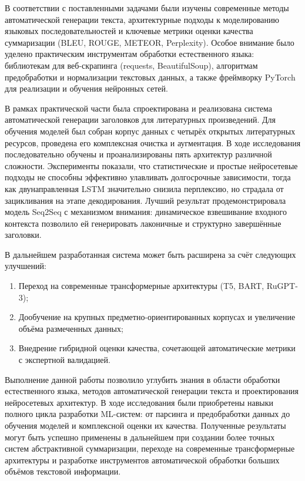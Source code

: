 \documentclass[coursework]{SCWorks}
\begin{document}
    \conclusion

    В соответствии с поставленными задачами были изучены современные методы автоматической генерации текста,
    архитектурные подходы к моделированию языковых последовательностей и ключевые метрики оценки качества суммаризации
    (BLEU, ROUGE, METEOR, Perplexity).
    Особое внимание было уделено практическим инструментам обработки естественного языка:
    библиотекам для веб-скрапинга (requests, BeautifulSoup),
    алгоритмам предобработки и нормализации текстовых данных,
    а также фреймворку PyTorch для реализации и обучения нейронных сетей.

    В рамках практической части была спроектирована и реализована система автоматической генерации заголовков
    для литературных произведений.
    Для обучения моделей был собран корпус данных с четырёх открытых литературных ресурсов,
    проведена его комплексная очистка и аугментация.
    В ходе исследования последовательно обучены и проанализированы пять архитектур различной сложности.
    Эксперименты показали, что статистические и простые нейросетевые подходы не способны эффективно улавливать
    долгосрочные зависимости, тогда как двунаправленная LSTM значительно снизила перплексию,
    но страдала от зацикливания на этапе декодирования.
    Лучший результат продемонстрировала модель Seq2Seq с механизмом внимания:
    динамическое взвешивание входного контекста позволило ей генерировать лаконичные и структурно завершённые заголовки.

    В дальнейшем разработанная система может быть расширена за счёт следующих улучшений:
    \begin{enumerate}
        \item Переход на современные трансформерные архитектуры (T5, BART, RuGPT-3);
        \item Дообучение на крупных предметно-ориентированных корпусах и увеличение объёма размеченных данных;
        \item Внедрение гибридной оценки качества, сочетающей автоматические метрики с экспертной валидацией.
    \end{enumerate}

    Выполнение данной работы позволило углубить знания в области обработки естественного языка,
    методов автоматической генерации текста и проектирования нейросетевых архитектур.
    В ходе исследования были приобретены навыки полного цикла разработки ML-систем:
    от парсинга и предобработки данных до обучения моделей и комплексной оценки их качества.
    Полученные результаты могут быть успешно применены в дальнейшем при создании более точных систем
    абстрактивной суммаризации, переходе на современные трансформерные архитектуры и разработке
    инструментов автоматической обработки больших объёмов текстовой информации.
\end{document}
